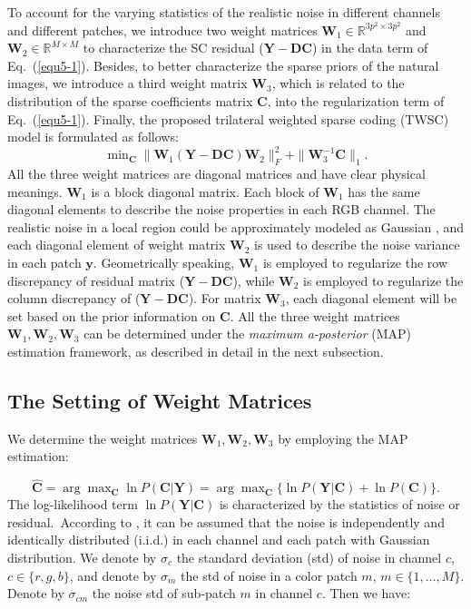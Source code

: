 To account for the varying statistics of the realistic noise in different channels and different patches, we introduce two weight matrices $\bm{W}_{1}\in\mathbb{R}^{3p^2\times3p^2}$ and $\bm{W}_{2}\in\mathbb{R}^{M\times M}$ to characterize the SC residual ($\bm{Y}-\bm{D}\bm{C}$) in the data term of Eq.\ (\ref{equ5-1}). Besides, to better characterize the sparse priors of the natural images, we introduce a third weight matrix $\bm{W}_{3}$, which is related to the distribution of the sparse coefficients matrix $\bm{C}$, into the regularization term of Eq.\ (\ref{equ5-1}). Finally, the proposed trilateral weighted sparse coding (TWSC) model is formulated as follows:
\begin{equation}
\label{equ5-3}
\min\nolimits_{\bm{C}}\|\bm{W}_{1}(\bm{Y}-\bm{D}\bm{C})\bm{W}_{2}\|_{F}^{2}
+
\|\bm{W}_{3}^{-1}\bm{C}\|_{1}.
\end{equation}
All the three weight matrices are diagonal matrices and have clear physical meanings. $\bm{W}_{1}$ is a block diagonal matrix. Each block of $\bm{W}_{1}$ has the same diagonal elements to describe the noise properties in each RGB channel. The realistic noise in a local region could be approximately modeled as Gaussian \cite{Leungtip}, and each diagonal element of weight matrix $\bm{W}_{2}$ is used to describe the noise variance in each patch $\bm{y}$. Geometrically speaking, $\bm{W}_{1}$ is employed to regularize the row discrepancy of residual matrix ($\bm{Y}-\bm{D}\bm{C}$), while $\bm{W}_{2}$ is employed to regularize the column discrepancy of ($\bm{Y}-\bm{D}\bm{C}$). For matrix $\bm{W}_{3}$, each diagonal element will be set based on the prior information on $\bm{C}$. All the three weight matrices $\bm{W}_{1},\bm{W}_{2},\bm{W}_{3}$ can be determined under the \textsl{maximum a-posterior} (MAP) estimation framework, as described in detail in the next subsection. 

 
\subsection{The Setting of Weight Matrices}

We determine the weight matrices $\bm{W}_{1},\bm{W}_{2},\bm{W}_{3}$ by employing the MAP estimation:

\begin{equation}
\label{equ5-4}
\hat{\bm{C}} 
=
\arg\max\nolimits_{\bm{C}}\ln P(\bm{C}|\bm{Y})
=
\arg\max\nolimits_{\bm{C}}\{\ln P(\bm{Y}|\bm{C})+\ln P(\bm{C})\}.
\end{equation}
The log-likelihood term $\ln P(\bm{Y}|\bm{C})$ is characterized by the
statistics of noise or residual.\ According to \cite{Leungtip}, it can be assumed that the noise is independently and identically distributed (i.i.d.) in each channel and each patch with Gaussian distribution. We denote by $\sigma_{c}$ the standard deviation (std) of noise in channel $c$, $c\in\{r,g,b\}$, and denote by $\sigma_{m}$ the std of noise in a color patch $m$, $m\in\{1,...,M\}$. Denote by $\sigma_{cm}$ the noise std of sub-patch $m$ in channel $c$. Then we have:

